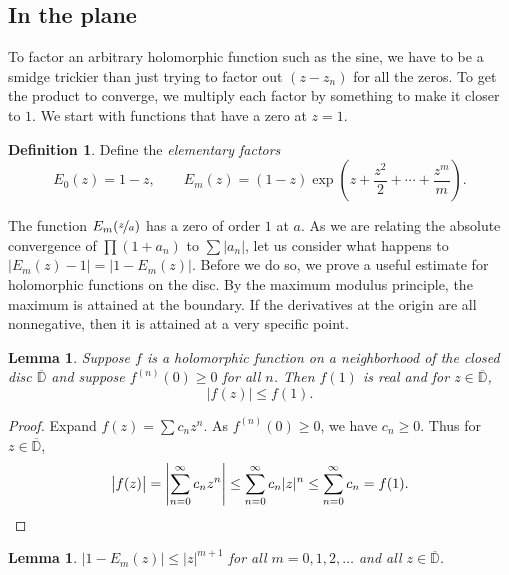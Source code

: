 \documentclass[12pt,openany]{book}
\newcommand{\glsadd}[2][]{}
\newcommand{\sabs}[1]{\lvert {#1} \rvert}
\newcommand{\babs}[1]{\bigl\lvert {#1} \bigr\rvert}
\newcommand{\abs}[1]{\left\lvert {#1} \right\rvert}
\newcommand{\D}{{\mathbb{D}}}
\newcommand{\myindex}[1]{#1\index{#1}}
\theoremstyle{plain}
\newtheorem{lemma}[thm]{Lemma}
\theoremstyle{remark}
\theoremstyle{definition}
\newtheorem{defn}[thm]{Definition}
\theoremstyle{exercise}
\theoremstyle{example}
\begin{document}
\subsection{In the plane}

To factor an arbitrary holomorphic function such as the sine,
we have to be a smidge trickier than just trying to factor out $(z-z_n)$
for all the zeros.  To
get the product to converge, we multiply each factor by something to
make it closer to $1$.  We start with functions that have a zero at
$z=1$.

\begin{defn}
Define the \emph{\myindex{elementary factors}}
\glsadd{not:elemfact}%
\begin{equation*}
E_0(z) = 1-z, \qquad
E_m(z) = (1-z) \exp\left( z +\frac{z^2}{2} + \cdots + \frac{z^m}{m} \right)
.
\end{equation*}
\end{defn}

The function $E_m(\nicefrac{z}{a})$ has a zero of order $1$ at $a$.
As we are relating the absolute convergence of $\prod (1+a_n)$ to $\sum
\sabs{a_n}$, let us consider what happens to $\babs{E_m(z)-1}=\babs{1-E_m(z)}$.
Before we do so, we prove a useful estimate for holomorphic functions
on the disc.
By the maximum modulus principle, the maximum is attained at the boundary.
If the derivatives at the origin are all nonnegative, then it is attained
at a very specific point.

\begin{lemma} \label{lemma:maxprincpositive}
Suppose $f$ is a holomorphic function on a neighborhood of the closed
disc $\overline{\D}$ and suppose $f^{(n)}(0) \geq 0$ for all $n$.
Then $f(1)$ is real and for $z \in \overline{\D}$,
\begin{equation*}
\babs{f(z)} \leq f(1) .
\end{equation*}
\end{lemma}

\begin{proof}
Expand $f(z) = \sum c_n z^n$.  As $f^{(n)}(0) \geq 0$,
we have $c_n \geq 0$.
Thus for $z \in \overline{\D}$,
\begin{equation*}
\babs{f(z)} =
\abs{\sum_{n=0}^\infty c_n z^n}
\leq
\sum_{n=0}^\infty c_n \sabs{z}^n
\leq
\sum_{n=0}^\infty c_n = f(1) .  \qedhere
\end{equation*}
\end{proof}

\begin{lemma} \label{lemma:elemfactbound}
\pagebreak[1]
$\sabs{1-E_m(z)} \leq \sabs{z}^{m+1}$ for all $m = 0,1,2,\ldots$ and all 
$z \in \overline{\D}$.
\end{lemma}
\end{document}
